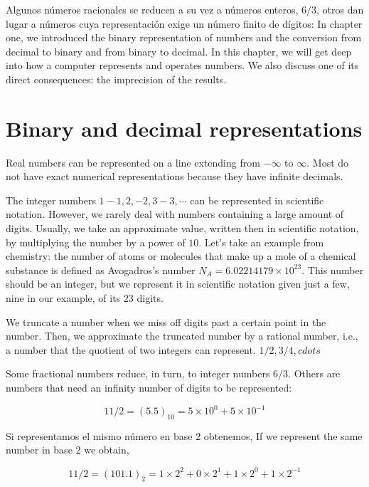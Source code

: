 \begin{paracol}{2}
Algunos números racionales se reducen a su vez a números enteros, $6/3$, otros dan lugar a números cuya representación exige un número finito de dígitos:
\switchcolumn
In chapter one, we introduced the binary representation of numbers and the conversion from decimal to binary and from binary to decimal. In this chapter, we will get deep into how a computer represents and operates numbers. We also discuss one of its direct consequences: the imprecision of the results.

\section{Binary and decimal representations}

Real numbers can be represented on a line extending from $-\infty$ to $\infty$. Most do not have exact numerical representations because they have infinite decimals.

The integer numbers $1-1,2,-2,3-3,\cdots$ can be represented in scientific notation. However, we rarely deal with numbers containing a large amount of digits. Usually, we take an approximate value, written then in scientific notation, by multiplying the number by a power of $10$. Let's take an example from chemistry: the number of atoms or molecules that make up a mole of a chemical substance is defined as Avogadros's number $N_A = 6.02214179 \times 10^{23}$. This number should be an integer, but we represent it in scientific notation given just a few, nine in our example, of its 23 digits.

 We truncate a number when we miss off digits past a certain point in the number. Then, we approximate the truncated number by a rational number, i.e., a number that the quotient of two integers can represent. $1/2,3/4,cdots$

Some fractional numbers reduce, in turn, to integer numbers $6/3$. Others are numbers that need an infinity number of digits to be represented: 
\end{paracol}
\begin{equation*}
11/2=(5.5)_{10}=5\times10^0+5\times10^{-1}
\end{equation*}
\begin{paracol}{2}
Si representamos el mismo número en base 2 obtenemos,
\switchcolumn
If we represent the same number in base 2 we obtain,
\end{paracol}
\begin{equation*}
11/2=(101.1)_2=1\times2^2+0\times2^1+1\times2^0+1\times2^{-1}
\end{equation*}
